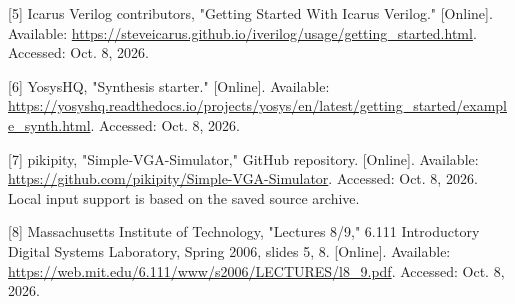 \documentclass[10pt,a4paper]{article}
\begin{document}
{\small\raggedright [5] Icarus Verilog contributors, "Getting Started With Icarus Verilog." [Online]. Available: \url{https://steveicarus.github.io/iverilog/usage/getting_started.html}. Accessed: Oct. 8, 2026.\par}

{\small\raggedright [6] YosysHQ, "Synthesis starter." [Online]. Available: \url{https://yosyshq.readthedocs.io/projects/yosys/en/latest/getting_started/example_synth.html}. Accessed: Oct. 8, 2026.\par}

{\small\raggedright [7] pikipity, "Simple-VGA-Simulator," GitHub repository. [Online]. Available: \url{https://github.com/pikipity/Simple-VGA-Simulator}. Accessed: Oct. 8, 2026. Local input support is based on the saved source archive.\par}

{\small\raggedright [8] Massachusetts Institute of Technology, "Lectures 8/9," 6.111 Introductory Digital Systems Laboratory, Spring 2006, slides 5, 8. [Online]. Available: \url{https://web.mit.edu/6.111/www/s2006/LECTURES/l8_9.pdf}. Accessed: Oct. 8, 2026.\par}
\end{document}
